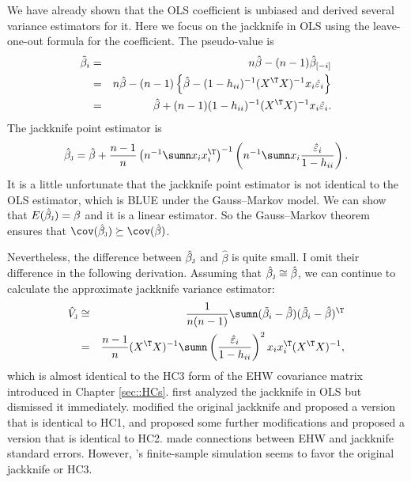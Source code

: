 We have already shown that the OLS coefficient is unbiased and derived several variance estimators for it. 
Here we focus on the jackknife in OLS using the leave-one-out formula for the coefficient. The pseudo-value is
\begin{eqnarray*}
\tilde{\beta}_i &=& n \hat{\beta} - (n-1) \hat{\beta}_{[-i]} \\
&=& n \hat{\beta} - (n-1) \left\{ \hat{\beta}-(1-h_{ii})^{-1}(X^{\T}X)^{-1}x_{i}\hat{\varepsilon}_{i} \right\} \\
&=& \hat{\beta}  + (n-1)  (1-h_{ii})^{-1}(X^{\T}X)^{-1}x_{i}\hat{\varepsilon}_{i} .
\end{eqnarray*}
The jackknife point estimator is 
$$
\hat{\beta}_\textsc{j} = \hat{\beta} + \frac{n-1}{n} \left( n^{-1} \sumn x_i x_i^{\T} \right)^{-1} 
\left(   n^{-1} \sumn x_{i}  \frac{  \hat{\varepsilon}_{i} }{ 1-h_{ii} }   \right) .
$$
 It is a little unfortunate that the jackknife point estimator is not identical to the OLS estimator, which is BLUE under the Gauss--Markov model.  
We can show that  $E(\hat{\beta}_\textsc{j} )  = \beta$ and it is a linear estimator. So the Gauss--Markov theorem ensures that $\cov( \hat{\beta}_\textsc{j} ) \succeq \cov( \hat{\beta})$. 
 
 
 Nevertheless, the difference between $\hat{\beta}_\textsc{j}$ and $\hat{\beta}$  is quite small. I omit their difference in the following derivation. Assuming that $\hat{\beta}_\textsc{j}  \cong \hat{\beta} $, we can continue to calculate the approximate jackknife variance estimator:
\begin{eqnarray*}
\hat{V}_\textsc{j} &\cong& \frac{1}{n(n-1)} \sumn (\tilde{\beta}_i - \hat{\beta})(\tilde{\beta}_i  - \hat{\beta})^{\T} \\
&=& \frac{n-1}{n} (X^{\T}X)^{-1}  \sumn \left(  \frac{  \hat{\varepsilon}_{i}  }{ 1-h_{ii}} \right)^2 x_{i}x_{i}^{\T}  (X^{\T}X)^{-1},
\end{eqnarray*} 
which is almost identical to the HC3 form of the EHW covariance matrix introduced in Chapter \ref{sec::HCs}. \citet{miller1974unbalanced} first analyzed the jackknife in OLS but dismissed it immediately. \citet{hinkley1977jackknifing} modified the original jackknife and proposed a version that is identical to HC1, and \citet{wu1986jackknife} proposed some further modifications and proposed a version that is identical to HC2. 
\citet{weber1986jackknife} made connections between EHW and jackknife standard errors. 
However, \citet{long2000using}'s finite-sample simulation seems to favor the original jackknife or HC3. 




